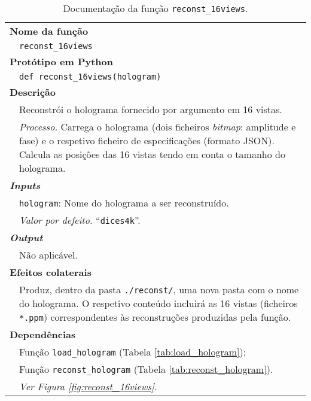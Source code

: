 \begin{table}[!hp]
    \centering
    \caption{Documentação da função \texttt{reconst\_16views}.}
    \label{tab:reconst_16views}
    \begin{tabular}{p{1cm} p{11.5cm}}
        \hline
        \multicolumn{2}{l}{\bfseries\small Nome da função}\\
         & \verb|reconst_16views|\\
        \hline
        \multicolumn{2}{l}{\bfseries\small Protótipo em Python}\\
         & \texttt{def reconst_16views(hologram)} \\
        \hline\multicolumn{2}{l}{\bfseries\small Descrição}\\
         & Reconstrói o holograma fornecido por argumento em 16 vistas. \\
         & \textit{Processo.} Carrega o holograma (dois ficheiros \textit{bitmap}: amplitude e fase) e o respetivo ficheiro de especificações (formato \ac{JSON}). Calcula as posições das 16 vistas tendo em conta o tamanho do holograma.\\
        \hline\multicolumn{2}{l}{\bfseries\small \textit{Inputs}}\\
         & \verb|hologram|: Nome do holograma a ser reconstruído.\\
         & \hspace{1cm} \textit{Valor por defeito.} ``\verb|dices4k|''.\\
        \hline\multicolumn{2}{l}{\bfseries\small \textit{Output}}\\
         & Não aplicável.\\
        \hline\multicolumn{2}{l}{\bfseries\small Efeitos colaterais}\\
         & Produz, dentro da pasta \verb|./reconst/|, uma nova pasta com o nome do holograma. O respetivo conteúdo incluirá as 16 vistas (ficheiros \verb|*.ppm|) correspondentes às reconstruções produzidas pela função.\\
        \hline\multicolumn{2}{l}{\bfseries\small Dependências}\\
         & Função \verb|load_hologram| (Tabela \ref{tab:load_hologram}); \\
         & Função \verb|reconst_hologram| (Tabela \ref{tab:reconst_hologram}). \\
         & \textit{Ver Figura \ref{fig:reconst_16views}.} \\
        \hline
    \end{tabular}
\end{table}

